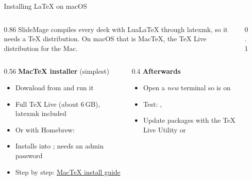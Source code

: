 
\begin{standardframe}{Installing LaTeX on macOS}
	\small
	\begin{columns}[c,onlytextwidth]
		\begin{column}{0.86\linewidth}
			SlideMage compiles every deck with LuaLaTeX through latexmk, so it needs a
			TeX distribution. On macOS that is MacTeX, the TeX Live distribution for the Mac.
		\end{column}
		\begin{column}{0.1\linewidth}
			\raggedleft{\fontsize{34}{34}\selectfont\faApple}
		\end{column}
	\end{columns}
	\par
	\begin{columns}[T,onlytextwidth]
		\begin{column}{0.56\linewidth}
			\textbf{MacTeX installer} (simplest)
			\begin{itemize}
				\item Download  from  and run it
				\item Full TeX Live (about 6\,GB), latexmk included
				\item Or with Homebrew: 
				\item Installs into ; needs an admin password
				\item Step by step: \href{https://tug.org/mactex/mactex-download.html}{MacTeX install guide}
			\end{itemize}
		\end{column}
		\begin{column}{0.4\linewidth}
			\textbf{Afterwards}
			\begin{itemize}
				\item Open a \emph{new} terminal so  is on 
				\item Test: , 
				\item Update packages with the TeX Live Utility or 
			\end{itemize}
		\end{column}
	\end{columns}
\end{standardframe}
